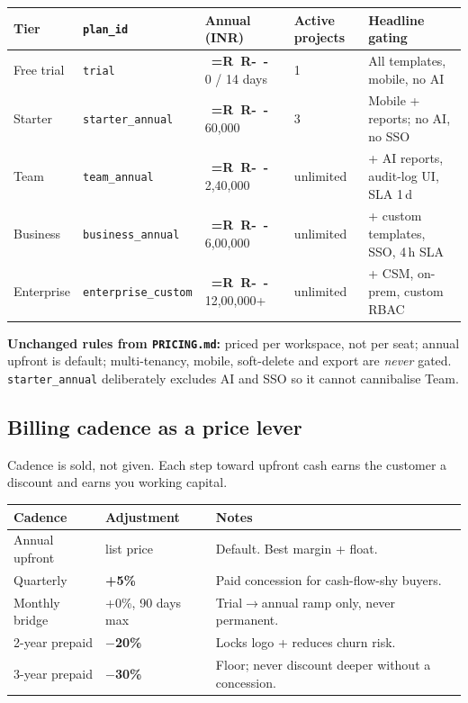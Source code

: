 \documentclass[11pt,a4paper]{article}
\newcommand{\Rs}{%
  \mbox{%
    \sffamily\bfseries
    \setbox0=\hbox{R}%
    R\kern-\wd0
    \raisebox{0.42em}{\rule{0.55em}{0.07em}}%
    \kern-\wd0
    \raisebox{0.25em}{\rule{0.55em}{0.07em}}%
    \kern\wd0
  }%
}
\newcommand{\plan}[1]{\texttt{\textcolor{accent}{#1}}}
\begin{document}
\begin{center}
\begin{longtable}{@{}L{2.0cm} L{3.9cm} R{2.3cm} L{1.6cm} L{3.4cm}@{}}
  \toprule
  \textbf{Tier} & \textbf{\texttt{plan\_id}} & \textbf{Annual (INR)} & \textbf{Active projects} & \textbf{Headline gating} \\
  \midrule
  \endhead
  Free trial   & \plan{trial}            & \Rs 0 / 14 days    & 1         & All templates, mobile, no AI \\
  Starter      & \plan{starter\_annual}  & \Rs 60{,}000       & 3         & Mobile + reports; no AI, no SSO \\
  Team         & \plan{team\_annual}     & \Rs 2{,}40{,}000   & unlimited & + AI reports, audit-log UI, SLA 1\,d \\
  Business     & \plan{business\_annual} & \Rs 6{,}00{,}000   & unlimited & + custom templates, SSO, 4\,h SLA \\
  Enterprise   & \plan{enterprise\_custom}& \Rs 12{,}00{,}000+ & unlimited & + CSM, on-prem, custom RBAC \\
  \bottomrule
\end{longtable}
\end{center}

\noindent\textbf{Unchanged rules from \texttt{PRICING.md}:} priced per workspace,
not per seat; annual upfront is default; multi-tenancy, mobile, soft-delete and
export are \emph{never} gated. \plan{starter\_annual} deliberately excludes AI and
SSO so it cannot cannibalise Team.

\subsection{Billing cadence as a price lever}
Cadence is sold, not given. Each step toward upfront cash earns the customer a
discount and earns you working capital.

\begin{center}
\begin{tabular}{@{}L{4.5cm} L{4.0cm} L{6.0cm}@{}}
  \toprule
  \textbf{Cadence} & \textbf{Adjustment} & \textbf{Notes} \\
  \midrule
  Annual upfront      & list price        & Default. Best margin + float. \\
  Quarterly           & \textbf{+5\%}     & Paid concession for cash-flow-shy buyers. \\
  Monthly bridge      & +0\%, 90 days max & Trial$\rightarrow$annual ramp only, never permanent. \\
  2-year prepaid      & \textbf{$-$20\%}  & Locks logo + reduces churn risk. \\
  3-year prepaid      & \textbf{$-$30\%}  & Floor; never discount deeper without a concession. \\
  \bottomrule
\end{tabular}
\end{center}
\end{document}
